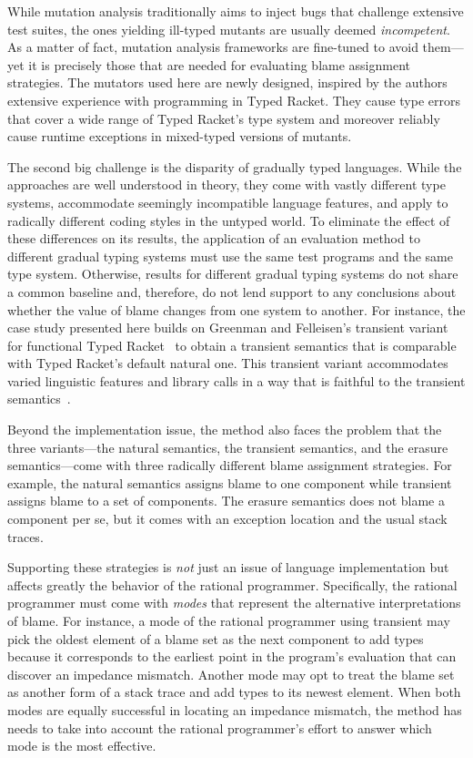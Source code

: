 While mutation analysis traditionally aims to inject bugs that challenge
extensive test suites, the ones yielding ill-typed mutants are usually deemed
\emph{incompetent}. As a matter of fact, mutation analysis frameworks are
fine-tuned to avoid them---yet it is precisely those that are needed for
evaluating blame assignment strategies. The mutators used here are newly designed,
inspired by the authors extensive experience with programming in Typed Racket.
They cause type errors that cover a wide range of Typed Racket's type system and moreover
reliably cause runtime exceptions in mixed-typed versions of mutants.

The second big challenge is the disparity of gradually
typed languages. While the approaches are well understood in theory,
they come with vastly different type systems, accommodate seemingly
incompatible language features, and apply to radically different coding
styles in the untyped world.  To eliminate the effect of these differences 
on its results, the application of an evaluation method to different
gradual typing systems must use the same test programs and the same type
system. Otherwise, results for different gradual typing systems 
do not share a common baseline and, therefore, do not lend support to any
conclusions about whether the value of blame changes from one system to
another. For instance, the case study presented here builds on
Greenman and Felleisen's transient variant for functional Typed
Racket~\cite{gf-icfp-2018} to obtain a transient semantics that is
comparable with Typed Racket's default natural one. This transient
variant accommodates varied linguistic features and library calls
in a way that is faithful to the transient
semantics~\cite{vss-popl-2017}.

Beyond the implementation issue, the method also faces the problem that
the three variants---the natural semantics, the transient semantics, and
the erasure semantics---come with three radically different blame
assignment strategies.  For example, the natural semantics assigns blame
to one component while transient assigns blame to a set of components. The
erasure semantics does not blame a component per se, but it comes with an
exception location and the usual stack traces. 

Supporting these strategies is {\em not\/} just an issue of language
implementation but affects greatly the behavior of the rational
programmer.  Specifically, the rational programmer must come with
\emph{modes} that represent the alternative interpretations of blame.  For
instance, a mode of the rational programmer using transient may pick the
oldest element of a blame set as the next component to add types because
it corresponds to the earliest point in the program's evaluation that can
discover an impedance mismatch.  Another mode may opt to treat the blame
set as another form of a stack trace and add types to its newest element.
When both modes are equally successful in locating an impedance mismatch,
the method has needs to take into account the rational programmer's effort
to answer which mode is the most effective. 

